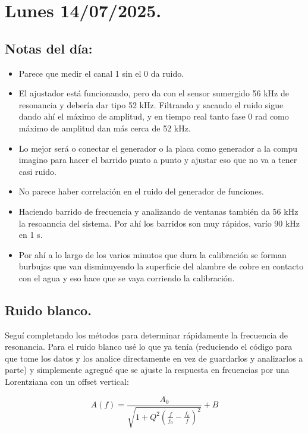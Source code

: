 \section{Lunes 14/07/2025.} 
\subsection*{Notas del día:}
\begin{itemize}
	\item Parece que medir el canal 1 sin el 0 da ruido. 
	\item El ajustador está funcionando, pero da con el sensor sumergido 56 kHz de resonancia y debería dar tipo 52 kHz. Filtrando y sacando el ruido sigue dando ahí el máximo de amplitud, y en tiempo real tanto fase 0 rad como máximo de amplitud dan más cerca de 52 kHz. 
	\item Lo mejor será o conectar el generador o la placa como generador a la compu imagino para hacer el barrido punto a punto y ajustar eso que no va a tener casi ruido.  
	
	\item  No parece haber correlación en el ruido del generador de funciones. 
	
	\item Haciendo barrido de frecuencia y analizando de ventanas también da 56 kHz la resoanncia del sistema. Por ahí los barridos son muy rápidos, varío 90 kHz en 1 s. 
	
	\item Por ahí a lo largo de los varios minutos que dura la calibración se forman burbujas que van disminuyendo la superficie del alambre de cobre en contacto con el agua y eso hace que se vaya corriendo la calibración. 
	
\end{itemize} 

\subsection*{Ruido blanco.} 
Seguí completando los métodos para determinar rápidamente la frecuencia de resonancia. Para el ruido blanco usé lo que ya tenía (reduciendo el código para que tome los datos y los analice directamente en vez de guardarlos y analizarlos a parte) y simplemente agregué que se ajuste la respuesta en frcuencias por una Lorentziana con un offset vertical:

\begin{equation}
	A(f) = \frac{A_0}{\sqrt{1 + Q^2 \left(\frac{f}{f_0}-\frac{f_0}{f}\right)^2}} + B 
\end{equation}


